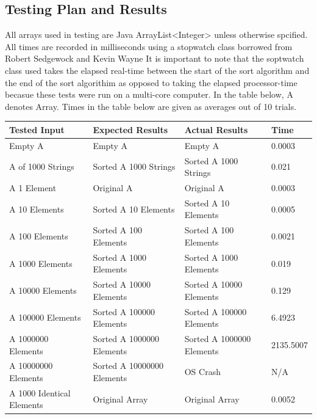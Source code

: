 \documentclass[onecolumn, 12pt, article]{IEEEtran}
\numberwithin{case}{problem}
\numberwithin{condition}{problem}
\numberwithin{condition}{subsection}
\numberwithin{definition}{section}
\theoremstyle{remark}
\numberwithin{question}{problem}
\theoremstyle{plain}
\numberwithin{answer}{problem}
\numberwithin{solution}{section}
\numberwithin{equation}{section}%
\begin{document}
\subsection{Testing Plan and Results}
All arrays used in testing are Java ArrayList<Integer> unless otherwise spcified. All times are recorded in milliseconds using a stopwatch class borrowed from Robert Sedgewock and Kevin Wayne %
It is important to note that the soptwatch class used takes the elapsed real-time between the start of the sort algorithm and the end of the sort algorithim as opposed to taking the elapsed processor-time becasue these tests were run on a multi-core computer.
In the table below, A denotes Array. Times in the table below are given as averages out of 10 trials.
\newline
{}
\begin{center}
\begin{tabular}{|l|l|l|l|}
\hline Tested Input & Expected Results & Actual Results & Time \\
\hline Empty A & Empty A & Empty A & 0.0003 \\
\hline A of 1000 Strings & Sorted A 1000 Strings & Sorted A 1000 Strings & 0.021 \\
\hline A 1 Element & Original A & Original A & 0.0003 \\
\hline A 10 Elements & Sorted A 10 Elements & Sorted A 10 Elements & 0.0005 \\
\hline A 100 Elements & Sorted A 100 Elements & Sorted A 100 Elements & 0.0021 \\
\hline A 1000 Elements & Sorted A 1000 Elements & Sorted A 1000 Elements & 0.019 \\
\hline A 10000 Elements & Sorted A 10000 Elements & Sorted A 10000 Elements & 0.129 \\
\hline A 100000 Elements & Sorted A 100000 Elements & Sorted A 100000 Elements & 6.4923 \\
\hline A 1000000 Elements & Sorted A 1000000 Elements & Sorted A 1000000 Elements & 2135.5007 \\
\hline A 10000000 Elements & Sorted A 10000000 Elements & OS Crash & N/A \\
\hline A 1000 Identical Elements & Original Array & Original Array & 0.0052 \\
\hline
\end{tabular}
\end{center}
\end{document}
